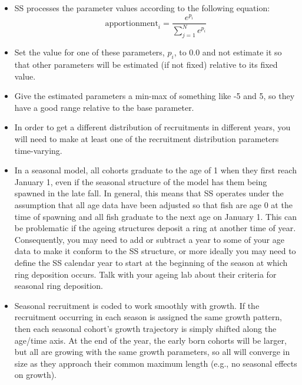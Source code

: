 	\begin{itemize}
		\item SS processes the parameter values according to the following equation:
		\begin{equation}
		\text{apportionment}_i = \frac{e^{p_i}}{\sum_{j=1}^{N}e^{p_i}}
		\end{equation}
		\item Set the value for one of these parameters, $p_i$, to 0.0 and not estimate it so that other parameters will be estimated (if not fixed) relative to its fixed value.
		\item Give the estimated parameters a min-max of something like -5 and 5, so they have a good range relative to the base parameter.
		\item In order to get a different distribution of recruitments in different years, you will need to make at least one of the recruitment distribution parameters time-varying.
		\item In a seasonal model, all cohorts graduate to the age of 1 when they first reach January 1, even if the seasonal structure of the model has them being spawned in the late fall. In general, this means that SS operates under the assumption that all age data have been adjusted so that fish are age 0 at the time of spawning and all fish graduate to the next age on January 1. This can be problematic if the ageing structures deposit a ring at another time of year. Consequently, you may need to add or subtract a year to some of your age data to make it conform to the SS structure, or more ideally you may need to define the SS calendar year to start at the beginning of the season at which ring deposition occurs. Talk with your ageing lab about their criteria for seasonal ring deposition.
		\item Seasonal recruitment is coded to work smoothly with growth. If the recruitment occurring in each season is assigned the same growth pattern, then each seasonal cohort’s growth trajectory is simply shifted along the age/time axis. At the end of the year, the early born cohorts will be larger, but all are growing with the same growth parameters, so all will converge in size as they approach their common maximum length (e.g., no seasonal effects on growth).

\end{itemize}
